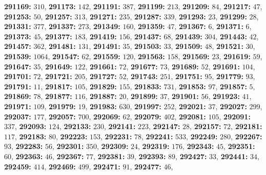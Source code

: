 \textsf{\bfseries 291169:} $310$, \textsf{\bfseries 291173:} $142$, \textsf{\bfseries 291191:} $387$, \textsf{\bfseries 291199:} $213$, \textsf{\bfseries 291209:} $84$, \textsf{\bfseries 291217:} $47$, \textsf{\bfseries 291253:} $50$, \textsf{\bfseries 291257:} $313$, \textsf{\bfseries 291271:} $235$, \textsf{\bfseries 291287:} $339$, \textsf{\bfseries 291293:} $23$, \textsf{\bfseries 291299:} $28$, \textsf{\bfseries 291331:} $377$, \textsf{\bfseries 291337:} $273$, \textsf{\bfseries 291349:} $160$, \textsf{\bfseries 291359:} $47$, \textsf{\bfseries 291367:} $6$, \textsf{\bfseries 291371:} $6$, \textsf{\bfseries 291373:} $45$, \textsf{\bfseries 291377:} $183$, \textsf{\bfseries 291419:} $156$, \textsf{\bfseries 291437:} $68$, \textsf{\bfseries 291439:} $304$, \textsf{\bfseries 291443:} $42$, \textsf{\bfseries 291457:} $362$, \textsf{\bfseries 291481:} $131$, \textsf{\bfseries 291491:} $35$, \textsf{\bfseries 291503:} $33$, \textsf{\bfseries 291509:} $48$, \textsf{\bfseries 291521:} $30$, \textsf{\bfseries 291539:} $1064$, \textsf{\bfseries 291547:} $62$, \textsf{\bfseries 291559:} $120$, \textsf{\bfseries 291563:} $158$, \textsf{\bfseries 291569:} $23$, \textsf{\bfseries 291619:} $59$, \textsf{\bfseries 291647:} $35$, \textsf{\bfseries 291649:} $122$, \textsf{\bfseries 291661:} $72$, \textsf{\bfseries 291677:} $73$, \textsf{\bfseries 291689:} $52$, \textsf{\bfseries 291691:} $104$, \textsf{\bfseries 291701:} $72$, \textsf{\bfseries 291721:} $205$, \textsf{\bfseries 291727:} $52$, \textsf{\bfseries 291743:} $251$, \textsf{\bfseries 291751:} $95$, \textsf{\bfseries 291779:} $93$, \textsf{\bfseries 291791:} $11$, \textsf{\bfseries 291817:} $105$, \textsf{\bfseries 291829:} $155$, \textsf{\bfseries 291833:} $731$, \textsf{\bfseries 291853:} $97$, \textsf{\bfseries 291857:} $5$, \textsf{\bfseries 291869:} $78$, \textsf{\bfseries 291877:} $116$, \textsf{\bfseries 291887:} $20$, \textsf{\bfseries 291899:} $37$, \textsf{\bfseries 291901:} $56$, \textsf{\bfseries 291923:} $41$, \textsf{\bfseries 291971:} $109$, \textsf{\bfseries 291979:} $19$, \textsf{\bfseries 291983:} $630$, \textsf{\bfseries 291997:} $252$, \textsf{\bfseries 292021:} $37$, \textsf{\bfseries 292027:} $299$, \textsf{\bfseries 292037:} $177$, \textsf{\bfseries 292057:} $700$, \textsf{\bfseries 292069:} $62$, \textsf{\bfseries 292079:} $402$, \textsf{\bfseries 292081:} $105$, \textsf{\bfseries 292091:} $337$, \textsf{\bfseries 292093:} $124$, \textsf{\bfseries 292133:} $230$, \textsf{\bfseries 292141:} $223$, \textsf{\bfseries 292147:} $28$, \textsf{\bfseries 292157:} $72$, \textsf{\bfseries 292181:} $117$, \textsf{\bfseries 292183:} $80$, \textsf{\bfseries 292223:} $153$, \textsf{\bfseries 292231:} $78$, \textsf{\bfseries 292241:} $533$, \textsf{\bfseries 292249:} $280$, \textsf{\bfseries 292267:} $93$, \textsf{\bfseries 292283:} $56$, \textsf{\bfseries 292301:} $350$, \textsf{\bfseries 292309:} $24$, \textsf{\bfseries 292319:} $176$, \textsf{\bfseries 292343:} $45$, \textsf{\bfseries 292351:} $60$, \textsf{\bfseries 292363:} $46$, \textsf{\bfseries 292367:} $77$, \textsf{\bfseries 292381:} $39$, \textsf{\bfseries 292393:} $89$, \textsf{\bfseries 292427:} $33$, \textsf{\bfseries 292441:} $34$, \textsf{\bfseries 292459:} $414$, \textsf{\bfseries 292469:} $499$, \textsf{\bfseries 292471:} $91$, \textsf{\bfseries 292477:} $46$, 
